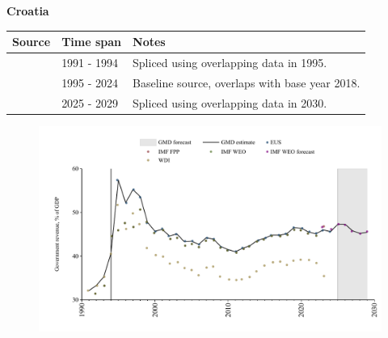 \documentclass[12pt,a4paper,landscape]{article}
\begin{document}
\begin{adjustbox}{max totalsize={\paperwidth}{\paperheight},center}
\begin{minipage}[t][\textheight][t]{\textwidth}
\vspace*{0.5cm}
{}
\begin{center}
{\Large\bfseries Croatia}
\end{center}
\vspace{0.5cm}
\begin{table}[H]
\centering
\small
\begin{tabular}{|l|l|l|}
\hline
\textbf{Source} & \textbf{Time span} & \textbf{Notes} \\
\hline
\rowcolor{white}\cite{WDI}& 1991 - 1994 &Spliced using overlapping data in 1995.\\
\rowcolor{lightgray}\cite{EUS}& 1995 - 2024 &Baseline source, overlaps with base year 2018.\\
\rowcolor{white}\cite{IMF_WEO_forecast}& 2025 - 2029 &Spliced using overlapping data in 2030.\\
\hline
\end{tabular}
\end{table}
\begin{figure}[H]
\centering
\includegraphics[width=\textwidth,height=0.6\textheight,keepaspectratio]{graphs/HRV_govrev_GDP.pdf}
\end{figure}
\end{minipage}
\end{adjustbox}
\end{document}
